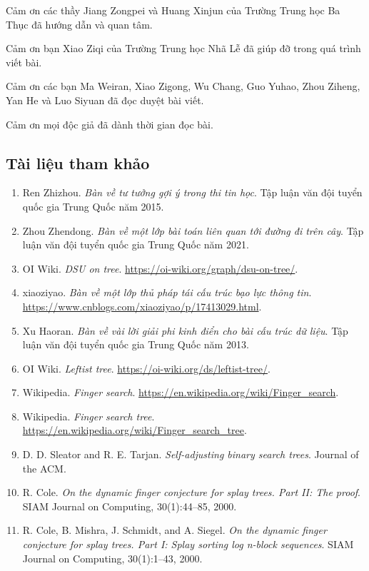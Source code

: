 \documentclass[11pt]{article}
\begin{document}
Cảm ơn các thầy Jiang Zongpei và Huang Xinjun của Trường Trung học Ba Thục đã
hướng dẫn và quan tâm.

Cảm ơn bạn Xiao Ziqi của Trường Trung học Nhã Lễ đã giúp đỡ trong quá trình
viết bài.

Cảm ơn các bạn Ma Weiran, Xiao Zigong, Wu Chang, Guo Yuhao, Zhou Ziheng, Yan
He và Luo Siyuan đã đọc duyệt bài viết.

Cảm ơn mọi độc giả đã dành thời gian đọc bài.

\subsection*{Tài liệu tham khảo}

\begin{enumerate}
  \item Ren Zhizhou. \emph{Bàn về tư tưởng gợi ý trong thi tin học}. Tập luận
  văn đội tuyển quốc gia Trung Quốc năm 2015.
  \item Zhou Zhendong. \emph{Bàn về một lớp bài toán liên quan tới đường đi
  trên cây}. Tập luận văn đội tuyển quốc gia Trung Quốc năm 2021.
  \item OI Wiki. \emph{DSU on tree}. \url{https://oi-wiki.org/graph/dsu-on-tree/}.
  \item xiaoziyao. \emph{Bàn về một lớp thủ pháp tái cấu trúc bạo lực thông
  tin}. \url{https://www.cnblogs.com/xiaoziyao/p/17413029.html}.
  \item Xu Haoran. \emph{Bàn về vài lời giải phi kinh điển cho bài cấu trúc dữ
  liệu}. Tập luận văn đội tuyển quốc gia Trung Quốc năm 2013.
  \item OI Wiki. \emph{Leftist tree}. \url{https://oi-wiki.org/ds/leftist-tree/}.
  \item Wikipedia. \emph{Finger search}.
  \url{https://en.wikipedia.org/wiki/Finger_search}.
  \item Wikipedia. \emph{Finger search tree}.
  \url{https://en.wikipedia.org/wiki/Finger_search_tree}.
  \item D. D. Sleator and R. E. Tarjan. \emph{Self-adjusting binary search
  trees}. Journal of the ACM.
  \item R. Cole. \emph{On the dynamic finger conjecture for splay trees. Part
  II: The proof}. SIAM Journal on Computing, 30(1):44--85, 2000.
  \item R. Cole, B. Mishra, J. Schmidt, and A. Siegel. \emph{On the dynamic
  finger conjecture for splay trees. Part I: Splay sorting log n-block
  sequences}. SIAM Journal on Computing, 30(1):1--43, 2000.

\end{enumerate}
\end{document}
